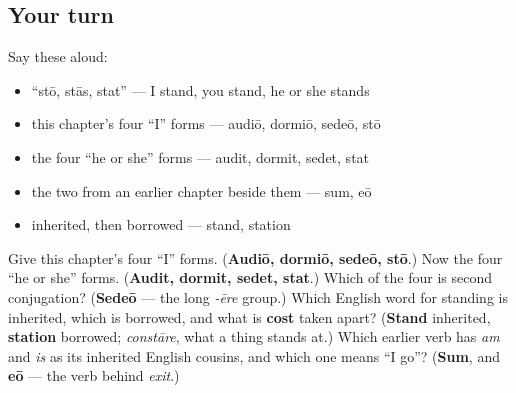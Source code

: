 \subsection*{Your turn}
Say these aloud:

\begin{itemize}
\raggedright
  \item \textquotedblleft{}stō, stās, stat\textquotedblright{} — I stand, you stand, he or she stands
  \item this chapter's four \textquotedblleft{}I\textquotedblright{} forms — audiō, dormiō, sedeō, stō
  \item the four \textquotedblleft{}he or she\textquotedblright{} forms — audit, dormit, sedet, stat
  \item the two from an earlier chapter beside them — sum, eō
  \item inherited, then borrowed — stand, station
\end{itemize}

\begin{tcolorbox}[breakable,colback=teal!4,colframe=teal!35!black,title={Before you move on}]
Give this chapter's four \textquotedblleft{}I\textquotedblright{} forms. (\textbf{Audiō, dormiō, sedeō, stō}.) Now the four \textquotedblleft{}he or she\textquotedblright{} forms. (\textbf{Audit, dormit, sedet, stat}.) Which of the four is second conjugation? (\textbf{Sedeō} — the long \emph{-ēre} group.) Which English word for standing is inherited, which is borrowed, and what is \textbf{cost} taken apart? (\textbf{Stand} inherited, \textbf{station} borrowed; \emph{constāre}, what a thing stands at.) Which earlier verb has \emph{am} and \emph{is} as its inherited English cousins, and which one means \textquotedblleft{}I go\textquotedblright{}? (\textbf{Sum}, and \textbf{eō} — the verb behind \emph{exit}.)
\end{tcolorbox}
